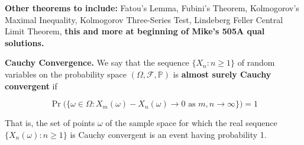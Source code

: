 \textbf{Other theorems to include:} Fatou's Lemma, Fubini's Theorem, Kolmogorov's Maximal Inequality, Kolmogorov Three-Series Test, Lindeberg Feller Central Limit Theorem, \textbf{this and more at beginning of Mike's 505A qual solutions.}

\begin{definition} \textbf{Cauchy Convergence.} We say that the sequence \(\{X_n: n \geq 1\}\) of random variables on the probability space \((\Omega, \mathcal{F}, \mathbb{P})\) is \textbf{almost surely Cauchy convergent} if

\[
\Pr \big( \{\omega \in \Omega: X_m(\omega) - X_n(\omega) \to 0 \text{ as } m, n \to \infty \} \big) = 1
\]

That is, the set of points \(\omega\) of the sample space for which the real sequence \(\{X_n(\omega): n \geq 1\}\) is Cauchy convergent is an event having probability 1.
\end{definition}


